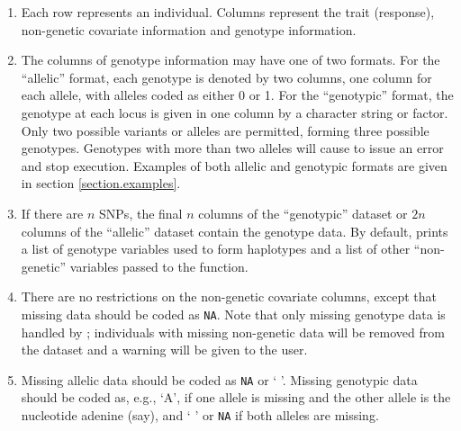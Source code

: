 \documentclass[article, shortnames]{jss}
\begin{document}
\begin{enumerate}

\item Each row represents an individual. Columns represent the trait 
(response), non-genetic covariate information and genotype information.

\item The columns of genotype information may have one of two formats. 
For the ``allelic'' format, each genotype is denoted by two columns, 
one column for each allele, with alleles coded as either 0 or 1. For the
``genotypic'' format, the genotype at each locus is given in one column by
a character string or factor. 
Only two possible variants or alleles are permitted,
forming three possible genotypes. Genotypes with 
more than two alleles will cause  to issue an 
error and stop execution. Examples of both allelic and genotypic
formats are given in section \ref{section.examples}.

\item If there are $n$ SNPs, the final $n$ columns of the ``genotypic'' 
dataset or $2n$ columns of the ``allelic'' dataset contain the genotype 
data. By default,  prints a list
of genotype variables used to form haplotypes and a list of 
other ``non-genetic'' variables passed to the function.

\item There are no restrictions on the non-genetic covariate columns,
except that missing data should be coded as {\tt NA}. 
Note that only missing
genotype data is handled by ; individuals with missing
non-genetic data will be removed from the dataset and a warning will be
given to the user.

\item Missing allelic data should be coded as {\tt NA} 
or ` '. 
Missing genotypic data should be coded as, e.g., 
`A', if one allele is missing and the other allele is the 
nucleotide adenine (say), and ` ' or {\tt NA} 
if both alleles are missing.

\end{enumerate}
\end{document}
